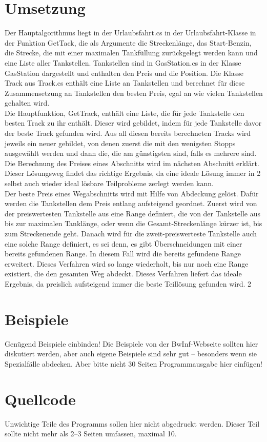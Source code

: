\documentclass[a4paper,10pt,ngerman]{scrartcl}
\begin{document}
\section{Umsetzung}
Der Hauptalgorithmus liegt in der Urlaubsfahrt.cs in der Urlaubsfahrt-Klasse in der Funktion GetTack, die als Argumente die Streckenlänge, das Start-Benzin, die Strecke, die mit einer maximalen Tankfüllung zurückgelegt werden kann und eine Liste aller Tankstellen. Tankstellen sind in GasStation.cs in der Klasse GasStation dargestellt und enthalten den Preis und die Position. Die Klasse Track aus Track.cs  enthält eine Liste an Tankstellen und berechnet für diese Zusammensetzung an Tankstellen den besten Preis, egal an wie vielen Tankstellen gehalten wird. \\
Die Hauptfunktion, GetTrack, enthält eine Liste, die für jede Tankstelle den besten Track zu ihr enthält. Dieser wird gebildet, indem für jede Tankstelle davor der beste Track gefunden wird. Aus all diesen bereits berechneten Tracks wird jeweils ein neuer gebildet, von denen zuerst die mit den wenigsten Stopps ausgewählt werden und dann die, die am günstigsten sind, falls es mehrere sind. Die Berechnung des Preises eines Abschnitts wird im nächsten Abschnitt erklärt. Dieser Lösungsweg findet das richtige Ergebnis, da eine ideale Lösung immer in 2 selbst auch wieder ideal lösbare Teilprobleme zerlegt werden kann. \\
Der beste Preis eines Wegabschnitts wird mit Hilfe von Abdeckung gelöst. Dafür werden die Tankstellen dem Preis entlang aufsteigend geordnet. Zuerst wird von der preiswertesten Tankstelle aus eine Range definiert, die von der Tankstelle aus bis zur maximalen Tanklänge, oder wenn die Gesamt-Streckenlänge kürzer ist, bis zum Streckenende geht. Danach wird für die zweit-preiswerteste Tankstelle auch eine solche Range definiert, es sei denn, es gibt Überschneidungen mit einer bereits gefundenen Range. In diesem Fall wird die bereits gefundene Range erweitert. Dieses Verfahren wird so lange wiederholt, bis nur noch eine Range existiert, die den gesamten Weg abdeckt. Dieses Verfahren liefert das ideale Ergebnis, da preislich aufsteigend immer die beste Teillösung gefunden wird. 
2
\section{Beispiele}
Genügend Beispiele einbinden! Die Beispiele von der BwInf-Webseite sollten hier diskutiert werden, aber auch eigene Beispiele sind sehr gut – besonders wenn sie Spezialfälle abdecken. Aber bitte nicht 30 Seiten Programmausgabe hier einfügen!

\section{Quellcode}
Unwichtige Teile des Programms sollen hier nicht abgedruckt werden. Dieser Teil sollte nicht mehr als 2–3 Seiten umfassen, maximal 10.
\end{document}
